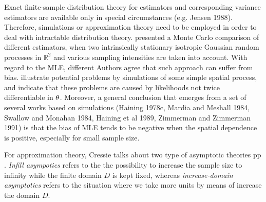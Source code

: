 Exact finite-sample distribution theory for estimators and corresponding variance estimators are available only in special circumstances (e.g. Jensen 1988). Therefore, simulations or approximation theory need to be employed in order to deal with intractable distribution theory. \cite{zimmerman1991comparison} presented a Monte Carlo comparison of different estimators, when two intrinsically stationary isotropic Gaussian random processes in $\mathbb{R}^{2}$ and various sampling intensities are taken into account. With regard to the MLE, different Authors agree that such approach can suffer from bias. \cite{warnes1987problems} illustrate potential problems by simulations of some simple spatial process, and \cite{mardia1989multimodality} indicate that these problems are caused by likelihoods not twice differentiable in $\theta$. Moreover, a general conclusion that emerges from a set of several works based on simulations (Haining 1978c, Mardia and Meshall 1984, Swallow and Monahan 1984, Haining et al 1989, Zimmerman and Zimmerman 1991) is that the bias of MLE tends to be negative when the spatial dependence is positive, especially for small sample size. %

For approximation theory, Cressie talks about two type of asymptotic theories {\color{red} pp }. \emph{Infill asympotics} refers to the the possibility to increase the sample size to infinity while the finite domain $D$ is kept fixed, whereas \emph{increase-domain asymptotics} refers to the situation where we take more units by means of increase the domain $D$. 


